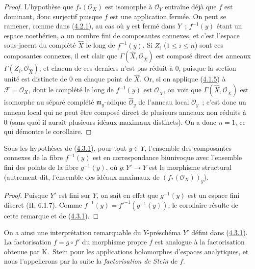 \begin{proof}
L'hypothèse que $f_*(\mathcal O_X)$ est isomorphe à $\mathcal O_Y$
entraîne déjà que $f$ est dominant, donc surjectif puisque $f$ est une
application fermée. On peut se ramener, comme dans
(\hyperref[III.4.2.1-fr]{4.2.1}), au cas où $y$ est fermé dans $Y$~;
$f^{-1}(y)$ étant un espace noethérien, a un nombre fini de composantes
connexes, et c'est l'espace sous-jacent du complété $\widehat X$ le long de
$f^{-1}(y)$. Si $Z_i$ ($1\leq i\leq n$) sont ces composantes connexes, il
est clair que $\Gamma(\widehat X,\mathcal O_{\widehat X})$ est composé
direct des anneaux $\Gamma(Z_i,\mathcal O_{\widehat X})$, et chacun de ces
derniers n'est pas réduit à $0$, puisque la section unité est distincte de
$0$ en chaque point de $\widehat X$. Or, si on applique
(\hyperref[III.4.1.5-fr]{4.1.5}) à $\mathcal F=\mathcal O_X$, dont le
complété le long de $f^{-1}(y)$ est $\mathcal O_{\widehat X}$, on voit que
$\Gamma(\widehat X,\mathcal O_{\widehat X})$ est isomorphe au séparé
complété $\mathfrak m_y$-adique $\widehat{\mathcal O}_y$ de l'anneau local
$\mathcal O_y$~; c'est donc un anneau local qui ne peut être composé
direct de plusieurs anneaux non réduits à $0$ (sans quoi il aurait
plusieurs idéaux maximaux distincts). On a donc $n=1$, ce qui démontre le
corollaire.
\end{proof}

\begin{corollary}[4.3.3]
\label{III.4.3.3-fr}
Sous les hypothèses de (\hyperref[III.4.3.1-fr]{4.3.1}), pour tout $y\in Y$,
l'ensemble des composantes connexes de la fibre $f^{-1}(y)$ est en
correspondance biunivoque avec l'ensemble fini des points de la fibre
$g^{-1}(y)$, où $g:Y'\to Y$ est le morphisme structural (autrement dit,
l'ensemble des idéaux maximaux de $(f_*(\mathcal O_X))_y$).
\end{corollary}

\begin{proof}
Puisque $Y'$ est fini sur $Y$, on sait en effet que $g^{-1}(y)$ est un
espace fini discret (II, 6.1.7). Comme
$f^{-1}(y)=f'^{-1}(g^{-1}(y))$, le corollaire résulte de cette remarque et
de (\hyperref[III.4.3.1-fr]{4.3.1}).
\end{proof}

On a ainsi une interprétation remarquable du $Y$-préschéma $Y'$ défini
dans (\hyperref[III.4.3.1-fr]{4.3.1}). La factorisation $f=g\circ f'$ du
morphisme propre $f$ est analogue à la factorisation obtenue par K.~Stein
pour les applications holomorphes d'espaces analytiques, et nous
l'appellerons par la suite la \emph{factorisation de Stein} de $f$.

